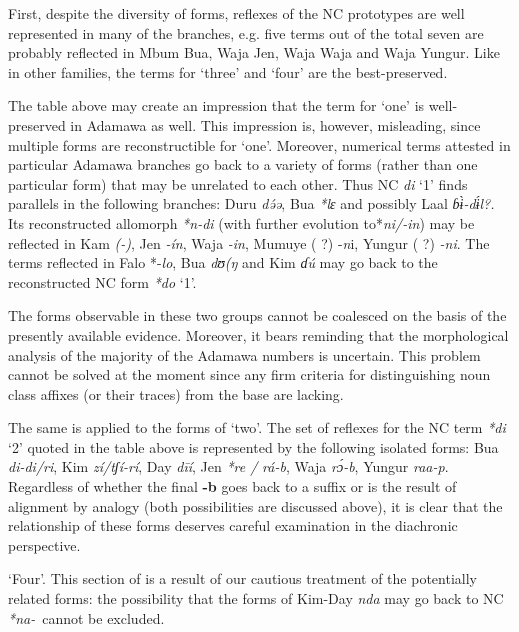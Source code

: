 First, despite the diversity of forms, reflexes of the NC prototypes are well represented in many of the branches, e.g. five terms out of the total seven are probably reflected in Mbum Bua, Waja Jen, Waja Waja and Waja Yungur. Like in other families, the terms for ‘three’ and ‘four’ are the best-preserved.

The table above may create an impression that the term for ‘one’ is well-preserved in Adamawa as well. This impression is, however, misleading, since multiple forms are reconstructible for ‘one’. Moreover, numerical terms attested in particular Adamawa branches go back to a variety of forms (rather than one particular form) that may be unrelated to each other. Thus NC \textit{di} ‘1’ finds parallels in the following branches: Duru \textit{d{\'{ə}}ə}, Bua \textit{*lɛ} and possibly Laal \textit{ɓ{\`{ɨ}}-d{\'{ɨ}}l?.} Its reconstructed allomorph \textit{*n-di} (with further evolution to*\textit{ni/-in}) may be reflected in Kam \textit{(-{}{})}, Jen \textit{-ín}, Waja \textit{-in}, Mumuye ( ?) -\textit{n}i, Yungur ( ?) \textit{-ni}. The terms reflected in Falo *-\textit{lo}, Bua \textit{dʊ(ŋ} and Kim \textit{ɗú} may go back to the reconstructed NC form \textit{*do} ‘1’.

The forms observable in these two groups cannot be coalesced on the basis of the presently available evidence. Moreover, it bears reminding that the morphological analysis of the majority of the Adamawa numbers is uncertain. This problem cannot be solved at the moment since any firm criteria for distinguishing noun class affixes (or their traces) from the base are lacking. 

The same is applied to the forms of ‘two’. The set of reflexes for the NC term \textit{*di} ‘2’ quoted in the table above is represented by the following isolated forms: Bua \textit{di-di/ri}, Kim \textit{zí/tʃí-rí}, Day \textit{d{\={i}}í}, Jen \textit{*re /}  \textit{rá-b}, Waja \textit{r{\'{ɔ}}-b}, Yungur \textit{raa-p}. Regardless of whether the final \textbf{-b} goes back to a suffix or is the result of alignment by analogy (both possibilities are discussed above), it is clear that the relationship of these forms deserves careful examination in the diachronic perspective.

‘Four’. This section of  is a result of our cautious treatment of the potentially related forms: the possibility that the forms of Kim-Day \textit{nda} may go back to NC \textit{*na}\textit{-}~cannot be excluded.


